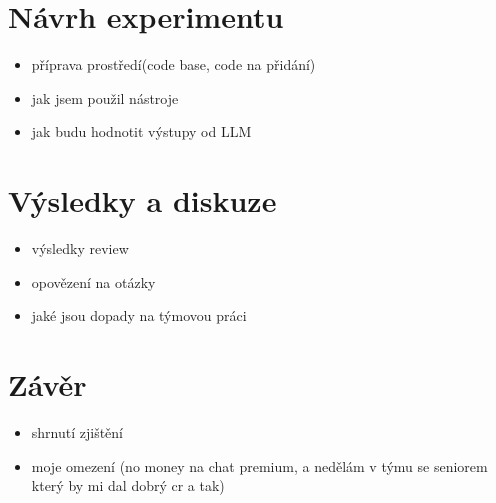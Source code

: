 \documentclass[12pt, a4paper]{article}
\begin{document}
\section{Návrh experimentu}
\begin{itemize}
  \item příprava prostředí(code base, code na přidání)
  \item jak jsem použil nástroje
  \item jak budu hodnotit výstupy od LLM
\end{itemize}

\section{Výsledky a diskuze}
\begin{itemize}
  \item výsledky review
  \item opovězení na otázky
  \item jaké jsou dopady na týmovou práci
\end{itemize}

\section{Závěr}
\begin{itemize}
  \item shrnutí zjištění
  \item moje omezení (no money na chat premium, a nedělám v týmu se seniorem který by mi dal dobrý cr a tak)
\end{itemize}



\end{document}

